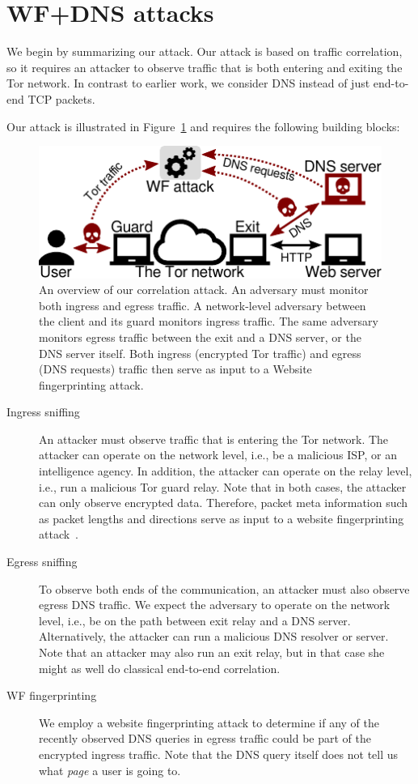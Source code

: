 \section{WF+DNS attacks}
\label{sec:attack}
We begin by summarizing our attack.  Our attack is based on traffic correlation,
so it requires an attacker to observe traffic that is both entering and exiting
the Tor network.  In contrast to earlier work, we consider DNS instead of just
end-to-end TCP packets.

Our attack is illustrated in Figure~\ref{fig:attack-scenario} and requires the
following building blocks:
\begin{figure}[t]
	\centering
	\includegraphics[width=0.8\linewidth]{figures/attack-scenario.pdf}
	\caption{An overview of our correlation attack.  An adversary must monitor
		both ingress and egress traffic.  A network-level adversary between the
		client and its guard monitors ingress traffic.  The same adversary
		monitors egress traffic between the exit and a DNS server, or the DNS
		server itself.  Both ingress (encrypted Tor traffic) and egress (DNS
		requests) traffic then serve as input to a Website fingerprinting
		attack.}
	\label{fig:attack-scenario}
\end{figure}

\begin{description}
	\item[Ingress sniffing] An attacker must observe traffic that is entering
		the Tor network.  The attacker can operate on the network level, i.e.,
		be a malicious ISP, or an intelligence agency.  In addition, the
		attacker can operate on the relay level, i.e., run a malicious Tor guard
		relay.  Note that in both cases, the attacker can only observe encrypted
		data.  Therefore, packet meta information such as packet lengths and
		directions serve as input to a website fingerprinting
		attack~\cite{Panchenko2016a}.
	\item[Egress sniffing] To observe both ends of the communication, an
		attacker must also observe egress DNS traffic.  We expect the adversary
		to operate on the network level, i.e., be on the path between exit relay
		and a DNS server.  Alternatively, the attacker can run a malicious DNS
		resolver or server.  Note that an attacker may also run an exit relay,
		but in that case she might as well do classical end-to-end correlation.
	\item[WF fingerprinting] We employ a website fingerprinting attack to
		determine if any of the recently observed DNS queries in egress traffic
		could be part of the encrypted ingress traffic.  Note that the DNS query
		itself does not tell us what \emph{page} a user is going to.
\end{description}

